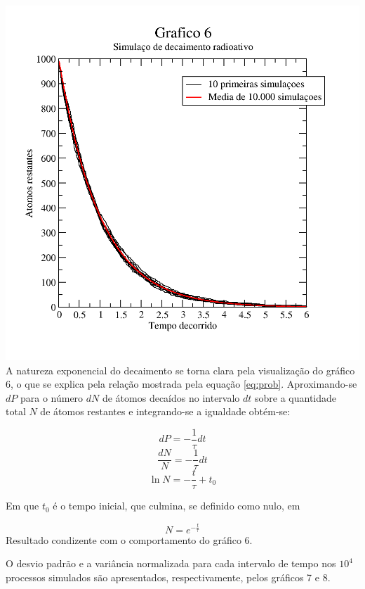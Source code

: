 \documentclass{article}
\begin{document}
\includegraphics[width=\textwidth]{graf6}
A natureza exponencial do decaimento se torna clara pela visualização do gráfico 6, o que se explica pela relação mostrada pela equação \ref{eq:prob}.
Aproximando-se $dP$ para o número $dN$ de átomos decaídos no intervalo $dt$ sobre a quantidade total $N$ de átomos restantes e integrando-se a igualdade obtém-se:

\[dP=-\frac{1}{\tau}dt\]
\[\frac{dN}{N} =- \frac{1}{\tau}dt\]
\[\ln N = -\frac{t}{\tau} + t_0\]

Em que $t_0$ é o tempo inicial, que culmina, se definido como nulo, em 

\[N = e^{-\frac{t}{\tau}}\]
Resultado condizente com o comportamento do gráfico 6.

O desvio padrão e a variância normalizada para cada intervalo de tempo nos $10^4$ processos simulados são apresentados, respectivamente, pelos gráficos 7 e 8.
\end{document}
